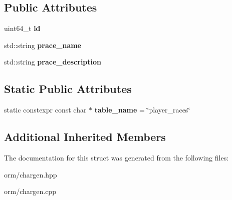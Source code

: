 \subsection*{Public Attributes}
\begin{DoxyCompactItemize}
\item 
\mbox{\label{structmods_1_1orm_1_1player__races_af8adb4d232aed38b91a72bf499909404}} 
uint64\+\_\+t {\bfseries id}
\item 
\mbox{\label{structmods_1_1orm_1_1player__races_aea50345ec921e7bb04c44921dfb0f85e}} 
std\+::string {\bfseries prace\+\_\+name}
\item 
\mbox{\label{structmods_1_1orm_1_1player__races_a5e205d8f29a363dc62514ba54826651e}} 
std\+::string {\bfseries prace\+\_\+description}
\end{DoxyCompactItemize}
\subsection*{Static Public Attributes}
\begin{DoxyCompactItemize}
\item 
\mbox{\label{structmods_1_1orm_1_1player__races_af6deb3064d5a695e0d48e4daf2500aa8}} 
static constexpr const char $\ast$ {\bfseries table\+\_\+name} = \char`\"{}player\+\_\+races\char`\"{}
\end{DoxyCompactItemize}
\subsection*{Additional Inherited Members}


The documentation for this struct was generated from the following files\+:\begin{DoxyCompactItemize}
\item 
orm/chargen.\+hpp\item 
orm/chargen.\+cpp\end{DoxyCompactItemize}
